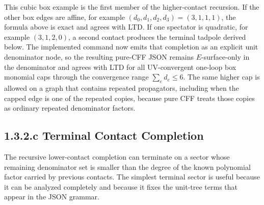 \documentclass[11pt,a4paper]{report}
\begin{document}
This cubic box example is the first member of the higher-contact recursion.  If
the other box edges are affine, for example
\((d_0,d_1,d_2,d_3)=(3,1,1,1)\), the formula above is exact and agrees with
LTD.  If one spectator is quadratic, for example \((3,1,2,0)\), a second
contact produces the terminal tadpole derived below.  The implemented command
now emits that completion as an explicit unit denominator node, so the resulting
pure-CFF JSON remains \(E\)-surface-only in the denominator and agrees with LTD
for all UV-convergent one-loop box monomial caps through the convergence range
\(\sum_e d_e\le6\).  The same higher cap is allowed on a graph that contains
repeated propagators, including when the capped edge is one of the repeated
copies, because pure CFF treats those copies as ordinary repeated denominator
factors.

\subsection*{1.3.2.c Terminal Contact Completion}

The recursive lower-contact completion can terminate on a sector whose
remaining denominator set is smaller than the degree of the known polynomial
factor carried by previous contacts.  The simplest terminal sector is useful
because it can be analyzed completely and because it fixes the unit-tree terms
that appear in the JSON grammar.
\end{document}
